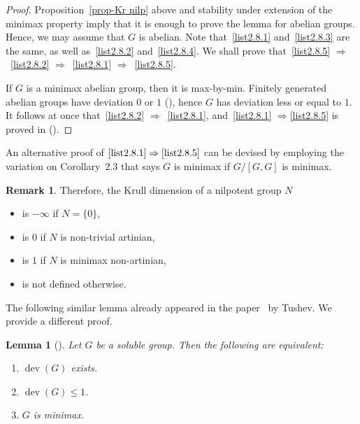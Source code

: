 \documentclass[11pt]{article}
\newtheorem{lemm}[theo]{Lemma}
\theoremstyle{definition}
\newtheorem{rema}[theo]{Remark}
\numberwithin{equation}{section}
\numberwithin{figure}{section}
\numberwithin{table}{section}
\DeclareMathOperator{\dev}{dev}
\newcommand*{\romanenumi}{\renewcommand*{\theenumi}{\roman{enumi}}}
\begin{document}
\begin{proof}
Proposition~\ref{prop-Kr nilp} above and stability under extension of the minimax property imply that it is enough to prove the lemma for abelian groups. Hence, we may assume that $G$ is abelian. Note that~\eqref{list2.8.1} and~\eqref{list2.8.3} are the same, as well as~\eqref{list2.8.2} and~\eqref{list2.8.4}. We shall prove that~\eqref{list2.8.5} $\Rightarrow$~\eqref{list2.8.2} $\Rightarrow$~\eqref{list2.8.1} $\Rightarrow$~\eqref{list2.8.5}.

If $G$ is a minimax abelian group, then it is max-by-min. Finitely generated abelian groups have deviation $0$ or $1$ (\cite[Lemma~2.19]{J}), hence $G$ has deviation less or equal to $1$. It follows at once that~\eqref{list2.8.2} $\Rightarrow$~\eqref{list2.8.1}, and~\eqref{list2.8.1} $\Rightarrow$\eqref{list2.8.5} is proved in (\cite[Lemma~4.6]{BCGS}).
\end{proof}

An alternative proof of $\eqref{list2.8.1}\Rightarrow\eqref{list2.8.5}$ can be devised by employing the variation on Corollary~2.3 that says $G$ is minimax if $G/[G,G]$ is minimax.



\begin{rema}
Therefore, the Krull dimension of a nilpotent group $N$
\begin{itemize}\romanenumi
\item \label{list2.9.1}is $-\infty$ if $N = \{0\}$,
\item \label{list2.9.2}is $0$ if $N$ is non-trivial artinian,
\item \label{list2.9.3}is $1$ if $N$ is minimax non-artinian,
\item \label{list2.9.4}is not defined otherwise.
\end{itemize}
\end{rema}

The following similar lemma already appeared in the paper~\cite{Tus} by Tushev. We provide a different proof.
\goodbreak
\begin{lemm}[\cite{Tus}]\label{lem-deviation soluble}
Let $G$ be a soluble group. Then the following are equivalent:
\begin{enumerate}
\item \label{list2.10.1}$\dev(G)$ exists.
\item \label{list2.10.2}$\dev(G)\le 1$.
\item \label{list2.10.3}$G$ is minimax.
\end{enumerate}
\end{lemm}
\end{document}
